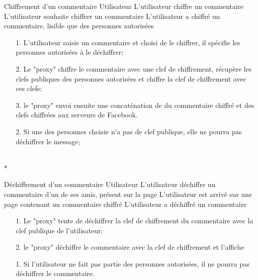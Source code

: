 \documentclass[a4paper,11pt,french]{article}
\begin{document}
\fiche
	{Chiffrement d'un commentaire}
	{Utilisateur}
	{L'utilisateur chiffre un commentaire}
	{}
	{L'utilisateur souhaite chiffrer un commentaire}
	{L'utilisateur a chiffré un commentaire, lisible que des personnes autorisées}
	{\begin{itemize}
	    \item[]
	  \item[1.] L'utilisateur saisie un commentaire et choisi de le chiffrer,
          il spécifie les personnes autorisées à le déchiffrer;
	\end{itemize}
	}
	{\begin{itemize}
        \item[]
		\item[2.] Le "proxy" chiffre le commentaire avec une clef 
        de chiffrement, récupère les clefs publiques
        des personnes autorisées et chiffre la clef de chiffrement
        avec ces clefs;
		\item[3.] le "proxy" envoi ensuite une concaténation de 
        du commentaire chiffré et des clefs chiffrées aux serveurs de Facebook.
	\end{itemize}
	}
	{}
\flots
    {\begin{itemize}
    \item[]
    \item[2.] Si une des personnes choisie n'a pas de clef publique,
        elle ne pourra pas déchiffrer le message;
    \end{itemize}
    }
	{}    
\\*

\fiche
	{Déchiffrement d'un commentaire}
	{Utilisateur}
	{L'utilisateur déchiffre un commentaire d'un de ses amis, présent sur la page}
	{}
	{L'utilisateur est arrivé sur une page contenant un commentaire chiffré}
	{L'utilisateur a déchiffré un commentaire}
    {}
	{\begin{itemize}
        \item[]
		\item[1.] Le "proxy" tente de déchiffrer la clef de chiffrement
            du commentaire avec la clef publique de l'utilisateur;
		\item[2.] le "proxy" déchiffre le commentaire avec la clef
            de chiffrement et l'affiche
	\end{itemize}
	}
	{}
\flots
    {}
    {\begin{itemize}
    \item[]
    \item[1.] Si l'utilisateur ne fait pas partie des personnes
        autorisées, il ne pourra pas déchiffrer le commentaire.
    \end{itemize}
    }
	{}    
\end{document}

